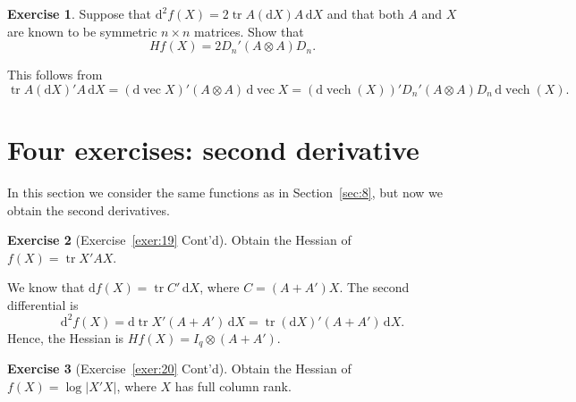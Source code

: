 \documentclass[12pt,a4paper]{article}
\makeatletter
\theoremstyle{definition}
\newtheorem{exercise}{Exercise}
\renewenvironment{proof}[1][\proofname]{\par
  \pushQED{\qed}%
  \normalfont \topsep6\p@\@plus6\p@\relax
  \trivlist
  \item[\hskip\labelsep\bfseries #1\@addpunct{.}]\ignorespaces
}{%
  \popQED\endtrivlist\@endpefalse
}
\newenvironment{solution}{%
  \begin{proof}[Solution]%
}{%
  \end{proof}%
}
\DeclareMathOperator{\tr}{tr}
\DeclareMathOperator{\vech}{vech}
\DeclareMathOperator{\avec}{vec}
\newcommand{\dd}{\mathrm{d}}
\makeatother
\begin{document}
\begin{exercise}\label{exer:28}
Suppose that $\dd^2 f(X) = 2\tr A(\dd X)A\, \dd X$ and that both $A$ and $X$ are known to be symmetric $n \times n$ matrices. Show that
\[
Hf(X) = 2D_n'(A \otimes A)D_n.
\]
\end{exercise}

\begin{solution}
This follows from
\[
\tr A(\dd X)'A\, \dd X = (\dd\avec X)'(A \otimes A)\, \dd\avec X
= (\dd\vech(X))' D_n'(A \otimes A) D_n\, \dd\vech(X).
\]
\end{solution}

\section{Four exercises: second derivative}\label{sec:12}

In this section we consider the same functions as in Section~\ref{sec:8}, but now we obtain the second derivatives. %

\begin{exercise}[Exercise~\ref{exer:19} Cont'd]\label{exer:29}
Obtain the Hessian of $f(X) = \tr X'AX$.
\end{exercise}

\begin{solution}
We know that $\dd f(X) = \tr C'\, \dd X$, where $C = (A + A')X$. The second differential is
\[
\dd^2 f(X) = \dd\tr X'(A + A')\, \dd X = \tr(\dd X)'(A + A')\, \dd X.
\]
Hence, the Hessian is $Hf(X) = I_q \otimes (A + A')$. %
\end{solution}

\begin{exercise}[Exercise~\ref{exer:20} Cont'd]\label{exer:30}
Obtain the Hessian of $f(X) = \log|X'X|$, where $X$ has full column rank.
\end{exercise}
\end{document}
